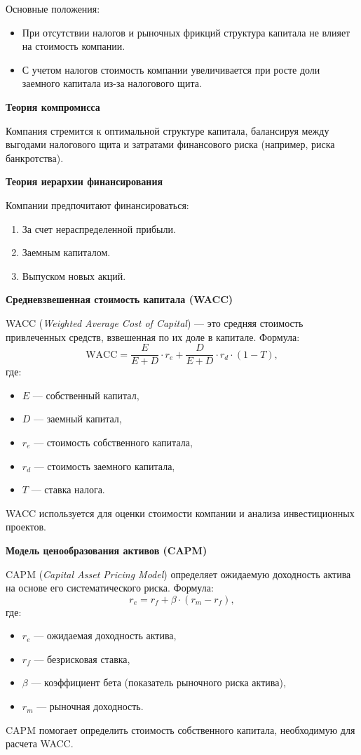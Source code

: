 Основные положения:
\begin{itemize}
    \item При отсутствии налогов и рыночных фрикций структура капитала не влияет на стоимость компании.
    \item С учетом налогов стоимость компании увеличивается при росте доли заемного капитала из-за налогового щита.
\end{itemize}

\textbf{Теория компромисса}

Компания стремится к оптимальной структуре капитала, балансируя между выгодами налогового щита и затратами финансового риска (например, риска банкротства).

\textbf{Теория иерархии финансирования}

Компании предпочитают финансироваться:
\begin{enumerate}
    \item За счет нераспределенной прибыли.
    \item Заемным капиталом.
    \item Выпуском новых акций.
\end{enumerate}

\textbf{Средневзвешенная стоимость капитала (WACC)}

WACC (\textit{Weighted Average Cost of Capital}) --- это средняя стоимость привлеченных средств, взвешенная по их доле в капитале. Формула:
\begin{equation}
    \text{WACC} = \frac{E}{E + D} \cdot r_e + \frac{D}{E + D} \cdot r_d \cdot (1 - T),
\end{equation}
\noindent где:
\begin{itemize}
    \item $E$ --- собственный капитал,
    \item $D$ --- заемный капитал,
    \item $r_e$ --- стоимость собственного капитала,
    \item $r_d$ --- стоимость заемного капитала,
    \item $T$ --- ставка налога.
\end{itemize}

WACC используется для оценки стоимости компании и анализа инвестиционных проектов.

\textbf{Модель ценообразования активов (CAPM)}

CAPM (\textit{Capital Asset Pricing Model}) определяет ожидаемую доходность актива на основе его систематического риска. Формула:
\begin{equation}
    r_e = r_f + \beta \cdot (r_m - r_f),
\end{equation}
\noindent где:
\begin{itemize}
    \item $r_e$ --- ожидаемая доходность актива,
    \item $r_f$ --- безрисковая ставка,
    \item $\beta$ --- коэффициент бета (показатель рыночного риска актива),
    \item $r_m$ --- рыночная доходность.
\end{itemize}

CAPM помогает определить стоимость собственного капитала, необходимую для расчета WACC.

